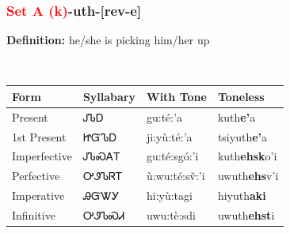 \subsubsection*{\textcolor{Red}{Set A (k)}{-}\textbf{uth}{-}[rev-e]}
\nopagebreak
\textbf{Definition: } he/she is picking him/her up
\\[0.5em]
\begin{tabularx}{\textwidth}{l X X X}%
\toprule%
\textbf{Form}&\textbf{Syllabary}&\textbf{With Tone}&\textbf{Toneless}\\%
\midrule%
Present&ᎫᏖᎠ&gu:té:’a&kuth\textbf{e'}a\\%
1st Present&ᏥᏳᏖᎠ&ji:yù:té:’a&tsiyuth\textbf{e'}a\\%
Imperfective&ᎫᏖᏍᎪᎢ&gu:té:sgó:’i&kuth\textbf{ehsk}o'i\\%
Perfective&ᎤᏭᏖᏒᎢ&ù:wu:té:sv̌:’i&uwuth\textbf{ehs}v'i\\%
Imperative&ᎯᏳᏔᎩ&hi:yù:tagi&hiyuth\textbf{aki}\\%
Infinitive&ᎤᏭᏖᏍᏗ&uwu:tè:sdi&uwuth\textbf{ehst}i\\%
\bottomrule%
\end{tabularx}
\\[1em]